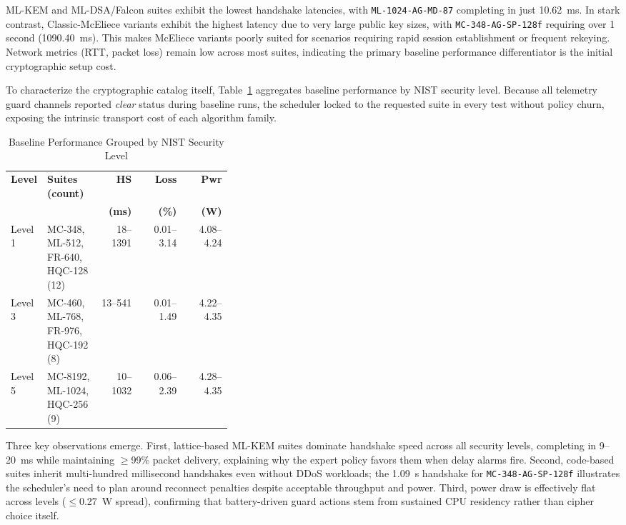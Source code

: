 \documentclass[sigconf,natbib=false]{acmart}
\begin{document}
ML-KEM and ML-DSA/Falcon suites exhibit the lowest handshake latencies, with \texttt{ML-1024-AG-MD-87} completing in just 10.62~ms. In stark contrast, Classic-McEliece variants exhibit the highest latency due to very large public key sizes, with \texttt{MC-348-AG-SP-128f} requiring over 1 second (1090.40~ms). This makes McEliece variants poorly suited for scenarios requiring rapid session establishment or frequent rekeying. Network metrics (RTT, packet loss) remain low across most suites, indicating the primary baseline performance differentiator is the initial cryptographic setup cost.

To characterize the cryptographic catalog itself, Table~\ref{tab:nist_level_baseline} aggregates baseline performance by NIST security level. Because all telemetry guard channels reported \textit{clear} status during baseline runs, the scheduler locked to the requested suite in every test without policy churn, exposing the intrinsic transport cost of each algorithm family.

\begin{table}[ht]
\centering
\caption{Baseline Performance Grouped by NIST Security Level}
\label{tab:nist_level_baseline}
\begingroup
\footnotesize
\setlength{\tabcolsep}{2pt}
\begin{tabular}{@{}p{0.12\linewidth}p{0.24\linewidth}rrr@{}} 
\toprule
\textbf{Level} & \textbf{Suites (count)} & \textbf{HS} & \textbf{Loss} & \textbf{Pwr} \\
 & & \textbf{(ms)} & \textbf{(\%)} & \textbf{(W)} \\
\midrule
Level 1 & MC-348, ML-512, FR-640, HQC-128 (12) & 18--1391 & 0.01--3.14 & 4.08--4.24 \\
Level 3 & MC-460, ML-768, FR-976, HQC-192 (8) & 13--541 & 0.01--1.49 & 4.22--4.35 \\
Level 5 & MC-8192, ML-1024, HQC-256 (9) & 10--1032 & 0.06--2.39 & 4.28--4.35 \\
\bottomrule
\end{tabular}
\endgroup
\end{table}

Three key observations emerge. First, lattice-based ML-KEM suites dominate handshake speed across all security levels, completing in 9--20~ms while maintaining $\geq$99\% packet delivery, explaining why the expert policy favors them when delay alarms fire. Second, code-based suites inherit multi-hundred millisecond handshakes even without DDoS workloads; the 1.09~s handshake for \texttt{MC-348-AG-SP-128f} illustrates the scheduler's need to plan around reconnect penalties despite acceptable throughput and power. Third, power draw is effectively flat across levels ($\leq$0.27~W spread), confirming that battery-driven guard actions stem from sustained CPU residency rather than cipher choice itself.
\end{document}
